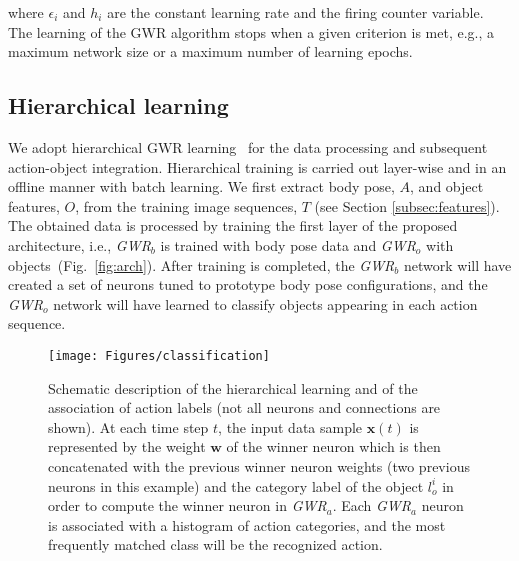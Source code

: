 \documentclass[5p,times]{elsarticle}
\begin{document}
\noindent where $\epsilon_i$ and $h_i$ are the constant learning rate and the firing counter variable. 
The learning of the GWR algorithm stops when a given criterion is met, e.g., a maximum network size or a maximum number of learning epochs.

\subsection{Hierarchical learning}\label{subsec:data_proc}

We adopt hierarchical GWR learning~\cite{parisiFrontiers} for the data processing and subsequent action-object integration.
Hierarchical training is carried out layer-wise and in an offline manner with batch learning.
We first extract body pose, $A$, and object features, $O$, from the training image sequences, $T$ (see Section \ref{subsec:features}).
The obtained data is processed by training the first layer of the proposed architecture, i.e., \textit{GWR}$_b$ is trained with body pose data and \textit{GWR}$_o$ with objects~(Fig.~\ref{fig:arch}).
After training is completed, the \textit{GWR}$_b$ network will have created a set of neurons tuned to prototype body pose configurations, and the \textit{GWR}$_o$ network will have learned to classify objects appearing in each action sequence.    

\begin{figure}
\begin{center}
\texttt{[image: Figures/classification]}
\end{center}
\caption{Schematic description of the hierarchical learning and of the association of action labels (not all neurons and connections are shown). 
At each time step $t$, the input data sample $\textbf{x}(t)$ is represented by the weight $\textbf{w}$ of the winner neuron which is then concatenated with the previous winner neuron weights (two previous neurons in this example) and the category label of the object $l_o^i$ in order to compute the winner neuron in \textit{GWR}$_a$. 
Each \textit{GWR}$_a$ neuron is associated with a histogram of action categories, and the most frequently matched class will be the recognized action.}\label{fig:classification}
\end{figure}
\end{document}
